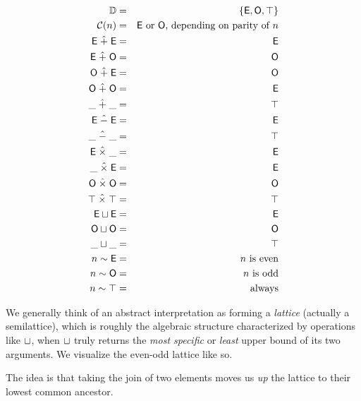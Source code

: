 \documentclass{amsbook}
\theoremstyle{definition}
\theoremstyle{remark}
\numberwithin{section}{chapter}
\numberwithin{equation}{chapter}
\begin{document}
\newcommand{\E}[0]{\mathsf{E}}
\renewcommand{\O}[0]{\mathsf{O}}
\begin{eqnarray*}
  \mathbb D &=& \{\E, \O, \top\} \\
  \mathcal C(n) &=& \textrm{$\E$ or $\O$, depending on parity of $n$} \\
  \E \; \hat{+} \; \E &=& \E \\
  \E \; \hat{+} \; \O &=& \O \\
  \O \; \hat{+} \; \E &=& \O \\
  \O \; \hat{+} \; \O &=& \E \\
  \_ \; \hat{+} \; \_ &=& \top \\
  \E \; \hat{-} \; \E &=& \E \\
  \_ \; \hat{-} \; \_ &=& \top \\
  \E \; \hat{\times} \; \_ &=& \E \\
  \_ \; \hat{\times} \; \E &=& \E \\
  \O \; \hat{\times} \; \O &=& \O \\
  \top \; \hat{\times} \; \top &=& \top \\
  \E \join \E &=& \E \\
  \O \join \O &=& \O \\
  \_ \join \_ &=& \top \\
  n \sim \E &=& \textrm{$n$ is even} \\
  n \sim \O &=& \textrm{$n$ is odd} \\
  n \sim \top &=& \textrm{always}
\end{eqnarray*}

We generally think of an abstract interpretation as forming a \emph{lattice} (actually a semilattice), which is roughly the algebraic structure characterized by operations like $\sqcup$, when $\sqcup$ truly returns the \emph{most specific} or \emph{least} upper bound of its two arguments.  We visualize the even-odd lattice like so.

\begin{center}\end{center}

The idea is that taking the join of two elements moves us \emph{up} the lattice to their lowest common ancestor.
\end{document}
